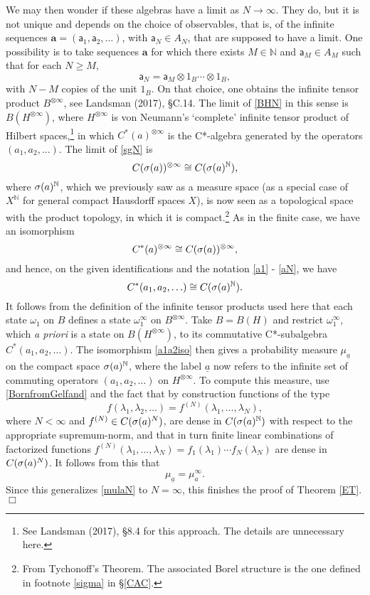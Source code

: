 \documentclass[11pt,a4paper]{article}
\numberwithin{equation}{section}
\newcommand{\er}{\eqref}
\newcommand{\beq}{\begin{equation}}
\newcommand{\eeq}{\end{equation}}
\newcommand{\ul}{\underline}
\newcommand{\raw}{\rightarrow}
\newcommand{\ot}{\otimes}
\newcommand{\Hs}{Hilbert space} \newcommand{\Bs}{Banach space}
\newcommand{\lm}{\lambda} \newcommand{\Lm}{\Lambda}
\newcommand{\om}{\omega} \newcommand{\Om}{\Omega}
\newcommand{\N}{{\mathbb N}} \newcommand{\R}{{\mathbb R}}
\begin{document}
 We may then wonder if these algebras have a limit as $N\raw\infty$. They do, but it is not unique and depends on the choice of observables, that is, of the infinite sequences $\mathbf{a}=(\mathsf{a}_1,\mathsf{a}_2, \ldots)$, with $\mathsf{a}_N\in A_N$, that are supposed to have a limit. One possibility is to take sequences $\mathbf{a}$ for which  there exists $M\in\N$ and $\mathsf{a}_M\in A_M$ such that for each $N\geq M$,
\beq
\mathsf{a}_N=\mathsf{a}_M \ot 1_B\cdots\ot 1_B, \label{anam}
\eeq
 with $N-M$ copies of the unit $1_B$. On that choice, one obtains the infinite tensor product $B^{\ot\infty}$, see Landsman (2017), \S C.14. The limit of \er{BHN} in this sense is $B(H^{\ot\infty})$, where $H^{\ot\infty}$ is von Neumann's `complete' infinite tensor product of \Hs s,\footnote{See Landsman (2017), \S 8.4 for this approach. The details are unnecessary here.}  
in which $C^*(a)^{\ot\infty}$ is the C*-algebra generated by the operators $(a_1,a_2, \ldots)$. 
 The limit of \er{sgN} is 
 \begin{equation}
C(\sg(a))^{\ot \infty}\cong C(\sg(a)^{\N}), 
\end{equation}
where $\sg(a)^{\N}$, which we previously  saw as a measure space (as a special case of $X^{\N}$ for general compact Hausdorff spaces $X$), is now seen as a topological space with the product  topology, in which it is compact.\footnote{From Tychonoff's Theorem. The associated Borel structure is the one defined in footnote \ref{sigma} in \S\ref{CAC}.} As in the finite case, we  have an isomorphism
\begin{equation}
C^*(a)^{\ot\infty}
\cong C(\sg(a))^{\ot \infty},
\end{equation}
and hence, on the given identifications and the notation \er{a1} - \er{aN}, we have
\begin{equation}
C^*(a_1, a_2, \ldots)\cong C(\sg(a)^{\N}). \label{a1a2iso}
\end{equation}
It follows from the definition of the infinite tensor products used here that each state $\om_1$ on $B$ defines a state
$\om_1^{\infty}$ on $B^{\ot\infty}$. Take $B=B(H)$ and restrict $\om_1^{\infty}$, which \emph{a priori} is a state on $B(H^{\ot\infty})$, to its commutative C*-subalgebra $C^*(a_1, a_2, \ldots)$. The isomorphism \er{a1a2iso} then gives a probability measure $\mu_{\ul{a}}$ on the compact space $\sg(a)^{\N}$, where the label $\ul{a}$ now refers to the infinite set of commuting operators $(a_1, a_2, \ldots)$ on $H^{\ot\infty}$. To compute this measure, use  \er{BornfromGelfand} and the fact that by construction functions of the type
\beq
f(\lm_1, \lm_2, \ldots)=f^{(N)}(\lm_1, \ldots, \lm_N),
\eeq  
 where $N<\infty$ and $f^{(N)}\in C(\sigma(a)^N)$, are dense in $C(\sg(a)^{\N})$ with respect to the appropriate supremum-norm, and that in turn finite linear combinations of factorized functions $f^{(N)}(\lm_1, \ldots, \lm_N)=f_1(\lm_1)\cdots f_N(\lm_N)$ are dense in $C(\sigma(a)^{N})$. 
 It follows from this that 
 \beq
 \mu_{\ul{a}}=\mu_a^{\infty}. \label{mula}
 \eeq
 Since this generalizes \er{mulaN} to $N=\infty$, 
 this finishes the proof of Theorem \ref{ET}. \hfill $\Box$
\end{document}

